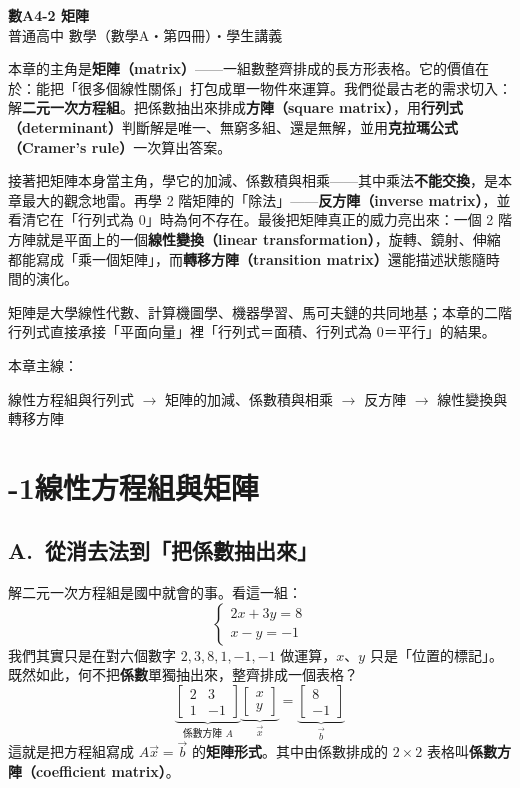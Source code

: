 \documentclass[11pt]{article}
\begin{document}
\begin{center}
{\sffamily\Huge\bfseries 數A4-2 矩陣}\\[3pt]
{\sffamily\large 普通高中 數學（數學A・第四冊）・學生講義}
\end{center}
\vspace{0.6em}

本章的主角是\textbf{矩陣（matrix）}——一組數整齊排成的長方形表格。它的價值在於：能把「很多個線性關係」打包成單一物件來運算。我們從最古老的需求切入：解\textbf{二元一次方程組}。把係數抽出來排成\textbf{方陣（square matrix）}，用\textbf{行列式（determinant）}判斷解是唯一、無窮多組、還是無解，並用\textbf{克拉瑪公式（Cramer's rule）}一次算出答案。

接著把矩陣本身當主角，學它的加減、係數積與相乘——其中乘法\textbf{不能交換}，是本章最大的觀念地雷。再學 2 階矩陣的「除法」——\textbf{反方陣（inverse matrix）}，並看清它在「行列式為 $0$」時為何不存在。最後把矩陣真正的威力亮出來：一個 2 階方陣就是平面上的一個\textbf{線性變換（linear transformation）}，旋轉、鏡射、伸縮都能寫成「乘一個矩陣」，而\textbf{轉移方陣（transition matrix）}還能描述狀態隨時間的演化。

矩陣是大學線性代數、計算機圖學、機器學習、馬可夫鏈的共同地基；本章的二階行列式直接承接「平面向量」裡「行列式＝面積、行列式為 $0$＝平行」的結果。

\medskip
本章主線：

\begin{center}
線性方程組與行列式 $\rightarrow$ 矩陣的加減、係數積與相乘 $\rightarrow$ 反方陣 $\rightarrow$ 線性變換與轉移方陣
\end{center}

\section*{-1\quad 線性方程組與矩陣}

\subsection*{\sffamily A.\ 從消去法到「把係數抽出來」}

解二元一次方程組是國中就會的事。看這一組：
$$\begin{cases} 2x+3y=8\\ x-y=-1 \end{cases}$$
我們其實只是在對六個數字 $2,3,8,1,-1,-1$ 做運算，$x$、$y$ 只是「位置的標記」。既然如此，何不把\textbf{係數}單獨抽出來，整齊排成一個表格？
$$\underbrace{\begin{bmatrix} 2 & 3\\ 1 & -1 \end{bmatrix}}_{\text{係數方陣 }A}\underbrace{\begin{bmatrix} x\\ y \end{bmatrix}}_{\vec x}=\underbrace{\begin{bmatrix} 8\\ -1 \end{bmatrix}}_{\vec b}$$
這就是把方程組寫成 $A\vec x=\vec b$ 的\textbf{矩陣形式}。其中由係數排成的 $2\times2$ 表格叫\textbf{係數方陣（coefficient matrix）}。
\end{document}
